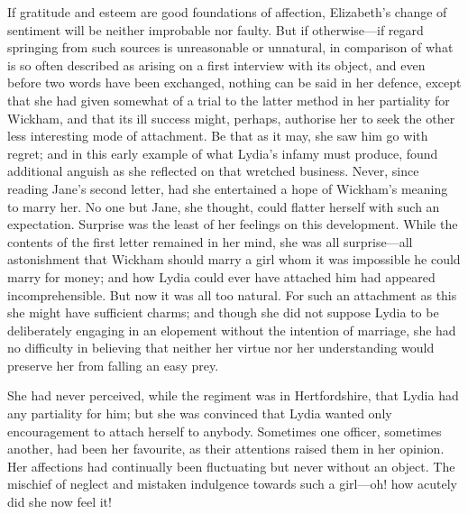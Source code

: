 If gratitude and esteem are good foundations of affection, Elizabeth's change of sentiment will be neither improbable nor faulty. But if otherwise---if regard springing from such sources is unreasonable or unnatural, in comparison of what is so often described as arising on a first interview with its object, and even before two words have been exchanged, nothing can be said in her defence, except that she had given somewhat of a trial to the latter method in her partiality for Wickham, and that its ill success might, perhaps, authorise her to seek the other less interesting mode of attachment. Be that as it may, she saw him go with regret; and in this early example of what Lydia's infamy must produce, found additional anguish as she reflected on that wretched business. Never, since reading Jane's second letter, had she entertained a hope of Wickham's meaning to marry her. No one but Jane, she thought, could flatter herself with such an expectation. Surprise was the least of her feelings on this development. While the contents of the first letter remained in her mind, she was all surprise---all astonishment that Wickham should marry a girl whom it was impossible he could marry for money; and how Lydia could ever have attached him had appeared incomprehensible. But now it was all too natural. For such an attachment as this she might have sufficient charms; and though she did not suppose Lydia to be deliberately engaging in an elopement without the intention of marriage, she had no difficulty in believing that neither her virtue nor her understanding would preserve her from falling an easy prey.

She had never perceived, while the regiment was in Hertfordshire, that Lydia had any partiality for him; but she was convinced that Lydia wanted only encouragement to attach herself to anybody. Sometimes one officer, sometimes another, had been her favourite, as their attentions raised them in her opinion. Her affections had continually been fluctuating but never without an object. The mischief of neglect and mistaken indulgence towards such a girl---oh! how acutely did she now feel it!

